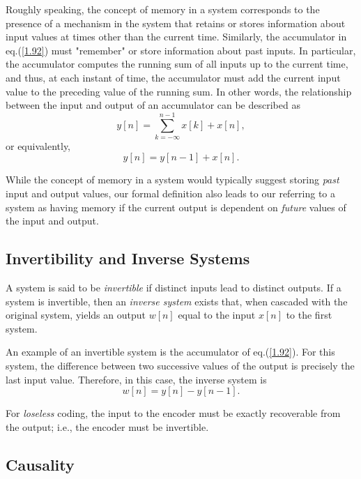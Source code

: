 \documentclass[a4paper,twoside]{book}
\begin{document}
Roughly speaking, the concept of memory in a system corresponds to the presence of a mechanism in the system that retains or stores information about input values at times other than the current time. Similarly, the accumulator in eq.\;(\ref{1.92}) must "remember" or store information about past inputs. In particular, the accumulator computes the running sum of all inputs up to the current time, and thus, at each instant of time, the accumulator must add the current input value to the preceding value of the running sum. In other words, the relationship between the input and output of an accumulator can be described as
\begin{equation}
    y[n] = \sum_{k = -\infty}^{n-1}x[k] + x[n],
    \label{1.95}
\end{equation}
or equivalently,
\begin{equation}
    y[n]=y[n-1]+x[n].
    \label{1.96}
\end{equation}

While the concept of memory in a system would typically suggest storing \textit{past} input and output values, our formal definition also leads to our referring to a system as having memory if the current output is dependent on \textit{future} values of the input and output.

\subsection{Invertibility and Inverse Systems}

A system is said to be \textit{invertible} if distinct inputs lead to distinct outputs. If a system is invertible, then an \textit{inverse system} exists that, when cascaded with the original system, yields an output $w[n]$ equal to the input $x[n]$ to the first system.

An example of an invertible system is the accumulator of eq.\;(\ref{1.92}). For this system, the difference between two successive values of the output is precisely the last input value. Therefore, in this case, the inverse system is
\begin{equation}
    w[n]=y[n]-y[n-1].
    \label{1.99}
\end{equation}

For \textit{loseless} coding, the input to the encoder must be exactly recoverable from the output; i.e., the encoder must be invertible.

\subsection{Causality}
\label{section:1.6.3}
\end{document}
